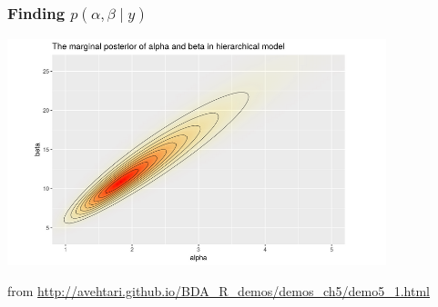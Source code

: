\documentclass{beamer}
\begin{document}
\begin{frame}[fragile]
\frametitle{Finding $p(\alpha,\beta \mid y)$ }

\begin{center}
\includegraphics[width=110mm]{marg_posterior.png}
\end{center}
from \url{http://avehtari.github.io/BDA_R_demos/demos_ch5/demo5_1.html}
\end{frame}
\end{document}
